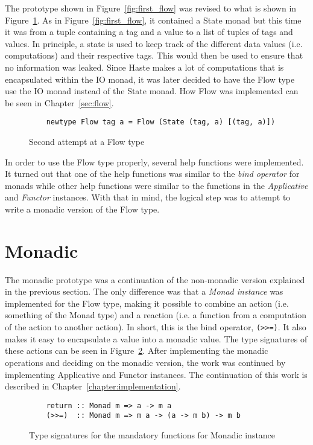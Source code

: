 The prototype shown in Figure~\ref{fig:first_flow} was revised to what is shown in Figure~\ref{fig:second_flow}. As in Figure~\ref{fig:first_flow}, it contained a State monad but this time it was from a tuple containing a tag and a value to a list of tuples of tags and values. In principle, a state is used to keep track of the different data values (i.e. computations) and their respective tags. This would then be used to ensure that no information was leaked. Since Haste makes a lot of computations that is encapsulated within the IO monad, it was later decided to have the Flow type use the IO monad instead of the State monad. How Flow was implemented can be seen in Chapter~\ref{sec:flow}.
\begin{figure}[h]
  \begin{verbatim}
    newtype Flow tag a = Flow (State (tag, a) [(tag, a)])
  \end{verbatim}
  \caption{Second attempt at a Flow type}
  \label{fig:second_flow}
\end{figure}

In order to use the Flow type properly, several help functions were implemented. It turned out that one of the help functions was similar to the \emph{bind operator} for monads while other help functions were similar to the functions in the \emph{Applicative} and \emph{Functor} instances. With that in mind, the logical step was to attempt to write a monadic version of the Flow type.
\section{Monadic}
The monadic prototype was a continuation of the non-monadic version explained in the previous section. The only difference was that a \emph{Monad instance} was implemented for the Flow type, making it possible to combine an action (i.e. something of the Monad type) and a reaction (i.e. a function from a computation of the action to another action). In short, this is the bind operator, {\tt (>>=)}. It also makes it easy to encapsulate a value into a monadic value. The type signatures of these actions can be seen in Figure~\ref{fig:monadic_actions}. After implementing the monadic operations and deciding on the monadic version, the work was continued by implementing Applicative and Functor instances. The continuation of this work is described in Chapter~\ref{chapter:implementation}.
\begin{figure}[h]
  \begin{verbatim}
    return :: Monad m => a -> m a
    (>>=)  :: Monad m => m a -> (a -> m b) -> m b
  \end{verbatim}
  \caption{Type signatures for the mandatory functions for Monadic instance}
  \label{fig:monadic_actions}
\end{figure}
